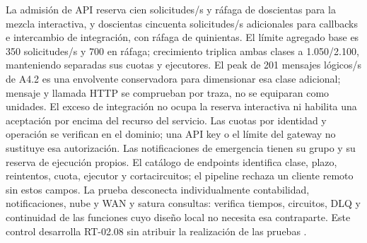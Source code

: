 La admisión de API reserva cien solicitudes/s y ráfaga de doscientas para la mezcla interactiva, y doscientas cincuenta solicitudes/s adicionales para callbacks e intercambio de integración, con ráfaga de quinientas. El límite agregado base es 350 solicitudes/s y 700 en ráfaga; crecimiento triplica ambas clases a 1.050/2.100, manteniendo separadas sus cuotas y ejecutores. El peak de 201 mensajes lógicos/s de A4.2 es una envolvente conservadora para dimensionar esa clase adicional; mensaje y llamada HTTP se comprueban por traza, no se equiparan como unidades. El exceso de integración no ocupa la reserva interactiva ni habilita una aceptación por encima del recurso del servicio. Las cuotas por identidad y operación se verifican en el dominio; una API key o el límite del gateway no sustituye esa autorización. Las notificaciones de emergencia tienen su grupo y su reserva de ejecución propios. El catálogo de endpoints identifica clase, plazo, reintentos, cuota, ejecutor y cortacircuitos; el pipeline rechaza un cliente remoto sin estos campos. La prueba desconecta individualmente contabilidad, notificaciones, nube y WAN y satura consultas: verifica tiempos, circuitos, DLQ y continuidad de las funciones cuyo diseño local no necesita esa contraparte. Este control desarrolla RT-02.08 sin atribuir la realización de las pruebas \parencite[RT-02.08/09, p.~7]{pucv-transversal}.
